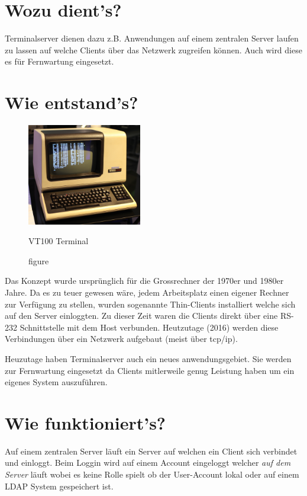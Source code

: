 \documentclass[11pt,twoside,a4paper]{article}
\title{\textbf{\titleText}}
\author{\authorText}
\date{\dateText}
\begin{document}
	\maketitle
	\tableofcontents
\clearpage
	\section{Wozu dient's?}
        \begin{multicols}{2}
          Terminalserver dienen dazu z.B. Anwendungen auf einem zentralen Server laufen zu lassen auf welche Clients über das Netzwerk zugreifen können. Auch wird diese es für Fernwartung eingesetzt. 
	\end{multicols}
	\section{Wie entstand's?}
	\begin{figure}
            \centering
            \includegraphics[width=5cm]{terminal}
            \caption{figure}{VT100 Terminal}
          \end{figure}

          \begin{multicols}{2}
          Das Konzept wurde ursprünglich für die Grossrechner der 1970er und 1980er Jahre. Da es zu teuer gewesen wäre, jedem Arbeitsplatz einen eigener Rechner zur Verfügung zu stellen, wurden sogenannte Thin-Clients installiert welche sich auf den Server einloggten. Zu dieser Zeit waren die Clients direkt über eine RS-232 Schnittstelle mit dem Host verbunden. Heutzutage (2016) werden diese Verbindungen über ein Netzwerk aufgebaut (meist über tcp/ip). 

          Heuzutage haben Terminalserver auch ein neues anwendungsgebiet. Sie werden zur Fernwartung eingesetzt da Clients mitlerweile genug Leistung haben um ein eigenes System auszuführen. 
	\end{multicols}
          
	\section{Wie funktioniert's?}
	\begin{multicols}{2}
          Auf einem zentralen Server läuft ein Server auf welchen ein Client sich verbindet und einloggt. Beim Loggin wird auf einem Account eingeloggt welcher \textit{auf dem Server} läuft wobei es keine Rolle spielt ob der User-Account lokal oder auf einem LDAP System gespeichert ist. 
	\end{multicols}
        
\end{document}
